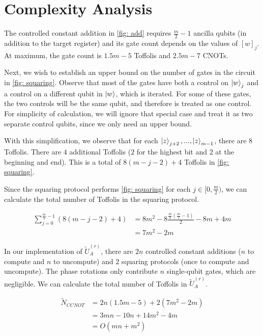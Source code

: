 \section{Complexity Analysis}

The controlled constant addition in \ref{fig: add} requires $\frac{m}{2} - 1$ ancilla qubits (in addition to the target register) and its gate count depends on the values of $[w]_j$. At maximum, the gate count is $1.5m - 5$ Toffolis and $2.5m - 7$ CNOTs.

Next, we wish to establish an upper bound on the number of gates in the circuit in \ref{fig: squaring}. Observe that most of the gates have both a control on $\ket{w}_j$ and a control on a different qubit in $\ket{w}$, which is iterated. For some of these gates, the two controls will be the same qubit, and therefore is treated as one control. For simplicity of calculation, we will ignore that special case and treat it as two separate control qubits, since we only need an upper bound.

With this simplification, we observe that for each $\ket{z}_{j + 2}, ..., \ket{z}_{m - 1}$, there are $8$ Toffolis. There are $4$ additional Toffolis ($2$ for the highest bit and $2$ at the beginning and end). This is a total of $8(m - j - 2) + 4$ Toffolis in \ref{fig: squaring}.

Since the squaring protocol performs \ref{fig: squaring} for each $j \in [0, \frac{m}{2})$, we can calculate the total number of Toffolis in the squaring protocol.

\begin{equation}
    \begin{split}
        \sum_{j = 0}^{\frac{m}{2} - 1} (8(m - j - 2) + 4) &= 8m^2 - 8\frac{\frac{m}{2}(\frac{m}{2} - 1)}{2} - 8m + 4m \\
        &= 7m^2 - 2m
    \end{split}
\end{equation}

In our implementation of $\tilde{U}_A^{(r)}$, there are $2n$ controlled constant additions ($n$ to compute and $n$ to uncompute) and $2$ squaring protocols (once to compute and uncompute). The phase rotations only contribute $n$ single-qubit gates, which are negligible. We can calculate the total number of Toffolis in $\tilde{U}_A^{(r)}$.

\begin{equation}
    \begin{split}
        \tilde{N}_{CCNOT} &= 2n(1.5m - 5) + 2(7m^2 - 2m) \\
        &= 3mn - 10n + 14m^2 - 4m \\
        &= O(mn + m^2) \label{eq: toffolis}
    \end{split}
\end{equation}

